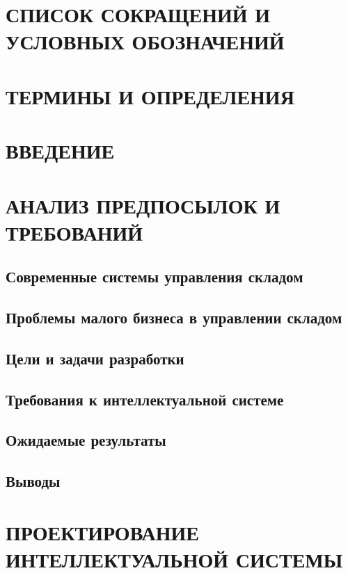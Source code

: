 \documentclass[14pt]{article}
\begin{document}
\tableofcontents  %

\newpage
\section*{СПИСОК СОКРАЩЕНИЙ И УСЛОВНЫХ ОБОЗНАЧЕНИЙ} 

\section*{ТЕРМИНЫ И ОПРЕДЕЛЕНИЯ}

\section*{ВВЕДЕНИЕ}

\newpage
\section{АНАЛИЗ ПРЕДПОСЫЛОК И ТРЕБОВАНИЙ}
\subsection{Современные системы управления складом}
\subsection{Проблемы малого бизнеса в управлении складом}
\subsection{Цели и задачи разработки}
\subsection{Требования к интеллектуальной системе}
\subsection{Ожидаемые результаты}
\subsection{Выводы}

\newpage
\section{ПРОЕКТИРОВАНИЕ ИНТЕЛЛЕКТУАЛЬНОЙ СИСТЕМЫ}
\end{document}
